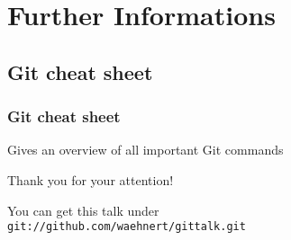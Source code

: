 \documentclass{beamer}
\begin{document}
\section{Further Informations}
\subsection{Git cheat sheet}
\begin{frame}
  \frametitle{Git cheat sheet}
  Gives an overview of all important Git commands
  \begin{center}
  \end{center}
\end{frame}

\begin{frame}
  \begin{center}{}
    \begin{LARGE}
      Thank you for your attention!
    \end{LARGE}
  \end{center}\bigskip

You can get this talk under\\
  \texttt{git://github.com/waehnert/gittalk.git}
\end{frame}
\end{document}
